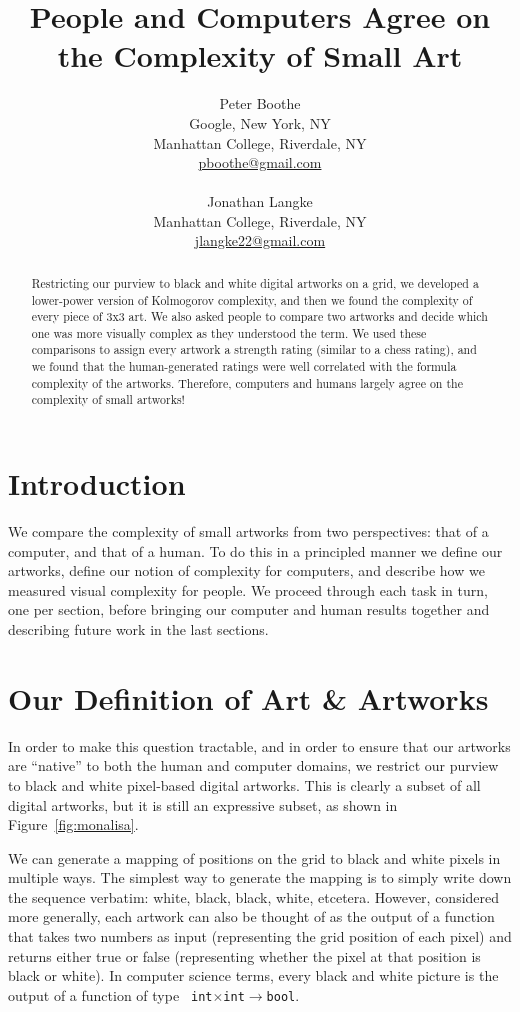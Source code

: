 \documentclass[11pt]{article}
\title{\textbf{People and Computers Agree on the Complexity of Small Art}}
\author{
	Peter Boothe \\
	Google, New York, NY \\
	Manhattan College, Riverdale, NY \\
	\url{pboothe@gmail.com} \\
	\\
	Jonathan Langke \\
	Manhattan College, Riverdale, NY \\
	\url{jlangke22@gmail.com}
}
\date{}
\begin{document}
\maketitle

\thispagestyle{empty}

\begin{abstract}

Restricting our purview to black and white digital artworks on a grid, we
developed a lower-power version of Kolmogorov complexity, and then we found the
complexity of every piece of 3x3 art.  We also asked people to compare two
artworks and decide which one was more visually complex as they understood the
term.  We used these comparisons to assign every artwork a strength rating
(similar to a chess rating), and we found that the human-generated ratings were
well correlated with the formula complexity of the artworks.  Therefore,
computers and humans largely agree on the complexity of small artworks!

\end{abstract}

\section*{Introduction}

We compare the complexity of small artworks from two perspectives: that of a
computer, and that of a human.  To do this in a principled manner we define our
artworks, define our notion of complexity for computers, and describe how we
measured visual complexity for people.  We proceed through each task in turn,
one per section, before bringing our computer and human results
together and describing future work in the last sections.

\section*{Our Definition of Art \& Artworks}

In order to make this question tractable, and in order to ensure that our
artworks are ``native'' to both the human and computer domains, we restrict our
purview to black and white pixel-based digital artworks.  This is clearly a
subset of all digital artworks, but it is still an expressive subset, as shown
in Figure~\ref{fig:monalisa}.  

We can generate a mapping of positions on the grid to black and white pixels in
multiple ways.  The simplest way to generate the mapping is to simply write
down the sequence verbatim: white, black, black, white, etcetera.  However,
considered more generally, each artwork can also be thought of as the output of
a function that takes two numbers as input (representing the grid position of
each pixel) and returns either true or false (representing whether the pixel at
that position is black or white).  In computer science terms, every black and
white picture is the output of a function of type {\tt
int$\times$int$\to$bool}.  
\end{document}

